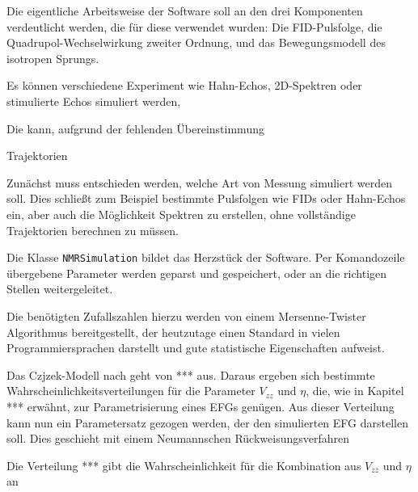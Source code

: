 Die eigentliche Arbeitsweise der Software soll an den drei Komponenten verdeutlicht werden, die für diese verwendet wurden: Die FID-Pulsfolge, die Quadrupol-Wechselwirkung zweiter Ordnung, und das Bewegungsmodell des isotropen Sprungs.







Es können verschiedene Experiment wie Hahn-Echos, 2D-Spektren oder stimulierte Echos simuliert werden, 







Die kann, aufgrund der fehlenden Übereinstimmung 







Trajektorien







Zunächst muss entschieden werden, welche Art von Messung simuliert werden soll. Dies schließt zum Beispiel bestimmte Pulsfolgen wie FIDs oder Hahn-Echos ein, aber auch die Möglichkeit Spektren zu erstellen, ohne vollständige Trajektorien berechnen zu müssen.


Die Klasse \texttt{NMRSimulation} bildet das Herzstück der Software. Per Komandozeile übergebene Parameter werden geparst und gespeichert, oder an die richtigen Stellen weitergeleitet.


Die benötigten Zufallszahlen hierzu werden von einem Mersenne-Twister Algorithmus bereitgestellt, der heutzutage einen Standard in vielen Programmiersprachen darstellt und gute statistische Eigenschaften aufweist.



Das Czjzek-Modell nach \cite{} geht von *** aus. Daraus ergeben sich bestimmte Wahrscheinlichkeitsverteilungen für die Parameter $V_{zz}$ und $\eta$, die, wie in Kapitel *** erwähnt, zur Parametrisierung eines EFGs genügen. Aus dieser Verteilung kann nun ein Parametersatz gezogen werden, der den simulierten EFG darstellen soll. Dies geschieht mit einem Neumannschen Rückweisungsverfahren

Die Verteilung *** gibt die Wahrscheinlichkeit für die Kombination aus $V_{zz}$ und $\eta$ an

